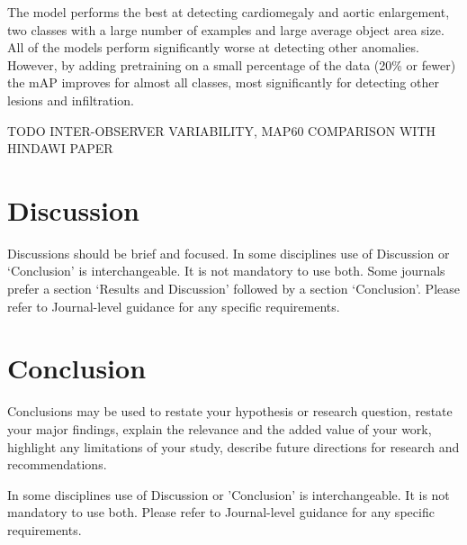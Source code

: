 \documentclass[conference]{IEEEtran}
\begin{document}
The model performs the best at detecting cardiomegaly and aortic enlargement, two classes with a large number of examples and large average object area size. All of the models perform significantly worse at detecting other anomalies. However, by adding pretraining on a small percentage of the data (20\% or fewer) the mAP improves for almost all classes, most significantly for detecting other lesions and infiltration.

TODO INTER-OBSERVER VARIABILITY, MAP60 COMPARISON WITH HINDAWI PAPER

\section{Discussion}\label{sec12}

Discussions should be brief and focused. In some disciplines use of Discussion or `Conclusion' is interchangeable. It is not mandatory to use both. Some journals prefer a section `Results and Discussion' followed by a section `Conclusion'. Please refer to Journal-level guidance for any specific requirements. 

\section{Conclusion}\label{sec13}

Conclusions may be used to restate your hypothesis or research question, restate your major findings, explain the relevance and the added value of your work, highlight any limitations of your study, describe future directions for research and recommendations. 

In some disciplines use of Discussion or 'Conclusion' is interchangeable. It is not mandatory to use both. Please refer to Journal-level guidance for any specific requirements. 


\end{document}
